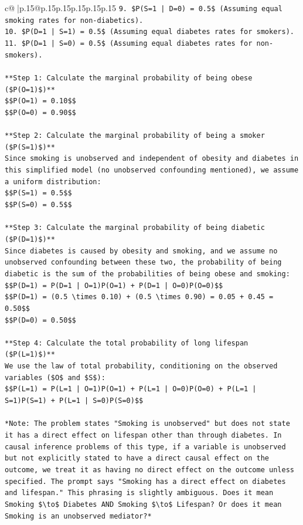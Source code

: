 \documentclass{article}
\begin{document}
{\begin{supertabular}{c@{$\;$}|p{.15\linewidth}@{}p{.15\linewidth}p{.15\linewidth}p{.15\linewidth}p{.15\linewidth}p{.15\linewidth}}
{{{\texttt{9.  \$P(S=1 | D=0) = 0.5\$ (Assuming equal smoking rates for non{-}diabetics).} \\
\texttt{10. \$P(D=1 | S=1) = 0.5\$ (Assuming equal diabetes rates for smokers).} \\
\texttt{11. \$P(D=1 | S=0) = 0.5\$ (Assuming equal diabetes rates for non{-}smokers).} \\
\\ 
\texttt{**Step 1: Calculate the marginal probability of being obese (\$P(O=1)\$)**} \\
\texttt{\$\$P(O=1) = 0.10\$\$} \\
\texttt{\$\$P(O=0) = 0.90\$\$} \\
\\ 
\texttt{**Step 2: Calculate the marginal probability of being a smoker (\$P(S=1)\$)**} \\
\texttt{Since smoking is unobserved and independent of obesity and diabetes in this simplified model (no unobserved confounding mentioned), we assume a uniform distribution:} \\
\texttt{\$\$P(S=1) = 0.5\$\$} \\
\texttt{\$\$P(S=0) = 0.5\$\$} \\
\\ 
\texttt{**Step 3: Calculate the marginal probability of being diabetic (\$P(D=1)\$)**} \\
\texttt{Since diabetes is caused by obesity and smoking, and we assume no unobserved confounding between these two, the probability of being diabetic is the sum of the probabilities of being obese and smoking:} \\
\texttt{\$\$P(D=1) = P(D=1 | O=1)P(O=1) + P(D=1 | O=0)P(O=0)\$\$} \\
\texttt{\$\$P(D=1) = (0.5 \textbackslash{}times 0.10) + (0.5 \textbackslash{}times 0.90) = 0.05 + 0.45 = 0.50\$\$} \\
\texttt{\$\$P(D=0) = 0.50\$\$} \\
\\ 
\texttt{**Step 4: Calculate the total probability of long lifespan (\$P(L=1)\$)**} \\
\texttt{We use the law of total probability, conditioning on the observed variables (\$O\$ and \$S\$):} \\
\texttt{\$\$P(L=1) = P(L=1 | O=1)P(O=1) + P(L=1 | O=0)P(O=0) + P(L=1 | S=1)P(S=1) + P(L=1 | S=0)P(S=0)\$\$} \\
\\ 
\texttt{*Note: The problem states "Smoking is unobserved" but does not state it has a direct effect on lifespan other than through diabetes. In causal inference problems of this type, if a variable is unobserved but not explicitly stated to have a direct causal effect on the outcome, we treat it as having no direct effect on the outcome unless specified. The prompt says "Smoking has a direct effect on diabetes and lifespan." This phrasing is slightly ambiguous. Does it mean Smoking \$\textbackslash{}to\$ Diabetes AND Smoking \$\textbackslash{}to\$ Lifespan? Or does it mean Smoking is an unobserved mediator?*} \\
}}}
\end{supertabular}}
\end{document}
